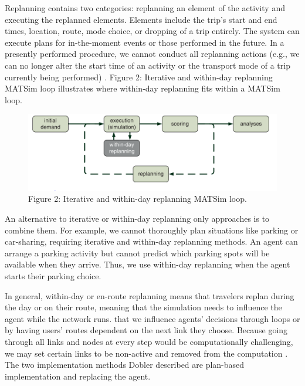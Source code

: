 \documentclass[
  letterpaper,
  authoryear]{elsarticle}
\begin{document}
Replanning contains two categories: replanning an element of the
activity and executing the replanned elements. Elements include the
trip's start and end times, location, route, mode choice, or dropping of
a trip entirely. The system can execute plans for in-the-moment events
or those performed in the future. In a presently performed procedure, we
cannot conduct all replanning actions (e.g., we can no longer alter the
start time of an activity or the transport mode of a trip currently
being performed) \citep{dobler2016}. Figure 2: Iterative and within-day
replanning MATSim loop illustrates where within-day replanning fits
within a MATSim loop.

\begin{figure}

{\centering \includegraphics{figures/fig2.png}

}

\caption{Figure 2: Iterative and within-day replanning MATSim loop.}

\end{figure}

An alternative to iterative or within-day replanning only approaches is
to combine them. For example, we cannot thoroughly plan situations like
parking or car-sharing, requiring iterative and within-day replanning
methods. An agent can arrange a parking activity but cannot predict
which parking spots will be available when they arrive. Thus, we use
within-day replanning when the agent starts their parking choice.

In general, within-day or en-route replanning means that travelers
replan during the day or on their route, meaning that the simulation
needs to influence the agent while the network runs.
\citet{dobler2016explains} that we influence agents' decisions through
loops or by having users' routes dependent on the next link they choose.
Because going through all links and nodes at every step would be
computationally challenging, we may set certain links to be non-active
and removed from the computation \citep{dobler2016}. The two
implementation methods Dobler described are plan-based implementation
and replacing the agent.
\end{document}
